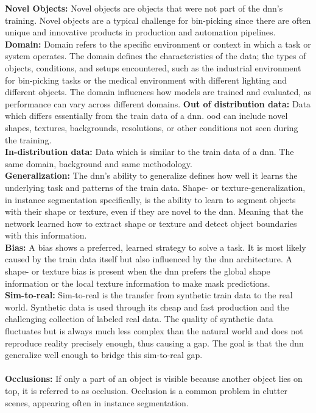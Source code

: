 		\textbf{Novel Objects:} Novel objects are objects that were not part of the \ac{dnn}'s training. Novel objects are a typical challenge for bin-picking since there are often unique and innovative products in production and automation pipelines.\\
		\textbf{Domain:} Domain refers to the specific environment or context in which a task or system operates. The domain defines the characteristics of the data; the types of objects, conditions, and setups encountered, such as the industrial environment for bin-picking tasks or the medical environment with different lighting and different objects. The domain influences how models are trained and evaluated, as performance can vary across different domains.
		\textbf{Out of distribution data:} Data which differs essentially from the train data of a \ac{dnn}. \acl{ood} can include novel shapes, textures, backgrounds, resolutions, or other conditions not seen during the training.\\
		\textbf{In-distribution data:} Data which is similar to the train data of a \ac{dnn}. The same domain, background and same methodology.\\
		\textbf{Generalization:} The \ac{dnn}'s ability to generalize defines how well it learns the underlying task and patterns of the train data. Shape- or texture-generalization, in instance segmentation specifically, is the ability to learn to segment objects with their shape or texture, even if they are novel to the \ac{dnn}. Meaning that the network learned how to extract shape or texture and detect object boundaries with this information. \\
		\textbf{Bias:} A bias shows a preferred, learned strategy to solve a task. It is most likely caused by the train data itself but also influenced by the \ac{dnn} architecture. A shape- or texture bias is present when the \ac{dnn} prefers the global shape information or the local texture information to make mask predictions.\\
		\textbf{Sim-to-real:} Sim-to-real is the transfer from synthetic train data to the real world. Synthetic data is used through its cheap and fast production and the challenging collection of labeled real data. The quality of synthetic data fluctuates but is always much less complex than the natural world and does not reproduce reality precisely enough, thus causing a gap. The goal is that the \ac{dnn} generalize well enough to bridge this sim-to-real gap.\\
		\\
		\textbf{Occlusions:} If only a part of an object is visible because another object lies on top, it is referred to as occlusion. Occlusion is a common problem in clutter scenes, appearing often in instance segmentation.
		
